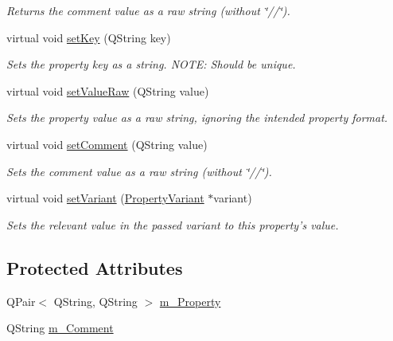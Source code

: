 \begin{DoxyCompactItemize}
\begin{DoxyCompactList}\small\item\em Returns the comment value as a raw string (without \char`\"{}//\char`\"{}). \end{DoxyCompactList}\item 
virtual void \hyperlink{class_base_property_a5ed5f7ca81d54b1506e62ed23db2a8c5}{set\-Key} (Q\-String key)
\begin{DoxyCompactList}\small\item\em Sets the property key as a string. N\-O\-T\-E\-: Should be unique. \end{DoxyCompactList}\item 
virtual void \hyperlink{class_base_property_adf0d7a0e824a9d058387336d91514539}{set\-Value\-Raw} (Q\-String value)
\begin{DoxyCompactList}\small\item\em Sets the property value as a raw string, ignoring the intended property format. \end{DoxyCompactList}\item 
virtual void \hyperlink{class_base_property_ac882e4b94451ae00ab78d79afde84de5}{set\-Comment} (Q\-String value)
\begin{DoxyCompactList}\small\item\em Sets the comment value as a raw string (without \char`\"{}//\char`\"{}). \end{DoxyCompactList}\item 
virtual void \hyperlink{class_base_property_ac326a09444274213c2a4ca1315ca37e5}{set\-Variant} (\hyperlink{class_property_variant}{Property\-Variant} $\ast$variant)
\begin{DoxyCompactList}\small\item\em Sets the relevant value in the passed variant to this property's value. \end{DoxyCompactList}\end{DoxyCompactItemize}
\subsection*{Protected Attributes}
\begin{DoxyCompactItemize}
\item 
Q\-Pair$<$ Q\-String, Q\-String $>$ \hyperlink{class_base_property_a2338fecdc198936259809444e93e93df}{m\-\_\-\-Property}
\item 
Q\-String \hyperlink{class_base_property_a2a08935cf352cb274575be32188e8acd}{m\-\_\-\-Comment}
\end{DoxyCompactItemize}


